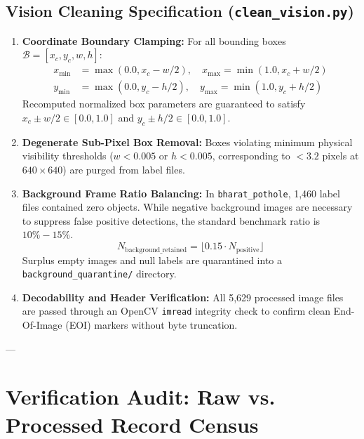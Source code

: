 \documentclass[11pt,a4paper]{article}
\begin{document}
\subsection{Vision Cleaning Specification (\texttt{clean\_vision.py})}
\begin{enumerate}
    \item \textbf{Coordinate Boundary Clamping:}
    For all bounding boxes $\mathcal{B} = [x_c, y_c, w, h]$:
    \begin{align}
    x_{\min} & = \max(0.0, x_c - w/2), \quad x_{\max} = \min(1.0, x_c + w/2) \\
    y_{\min} & = \max(0.0, y_c - h/2), \quad y_{\max} = \min(1.0, y_c + h/2)
    \end{align}
    Recomputed normalized box parameters are guaranteed to satisfy $x_c \pm w/2 \in [0.0, 1.0]$ and $y_c \pm h/2 \in [0.0, 1.0]$.
    
    \item \textbf{Degenerate Sub-Pixel Box Removal:}
    Boxes violating minimum physical visibility thresholds ($w < 0.005$ or $h < 0.005$, corresponding to $<3.2$ pixels at $640\times640$) are purged from label files.
    
    \item \textbf{Background Frame Ratio Balancing:}
    In \texttt{bharat\_pothole}, 1,460 label files contained zero objects. While negative background images are necessary to suppress false positive detections, the standard benchmark ratio is $10\% - 15\%$.
    \begin{equation}
    N_{\text{background\_retained}} = \lfloor 0.15 \cdot N_{\text{positive}} \rfloor
    \end{equation}
    Surplus empty images and null labels are quarantined into a \texttt{background\_quarantine/} directory.
    
    \item \textbf{Decodability and Header Verification:}
    All 5,629 processed image files are passed through an OpenCV \texttt{imread} integrity check to confirm clean End-Of-Image (EOI) markers without byte truncation.
\end{enumerate}

---

\section{Verification Audit: Raw vs. Processed Record Census}
\end{document}
